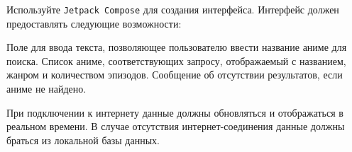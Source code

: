 Используйте \texttt{Jetpack Compose} для создания интерфейса. Интерфейс должен предоставлять следующие возможности:

Поле для ввода текста, позволяющее пользователю ввести название аниме для поиска.
Список аниме, соответствующих запросу, отображаемый с названием, жанром и количеством эпизодов.
Сообщение об отсутствии результатов, если аниме не найдено.

При подключении к интернету данные должны обновляться и отображаться в реальном времени.
В случае отсутствия интернет-соединения данные должны браться из локальной базы данных.

